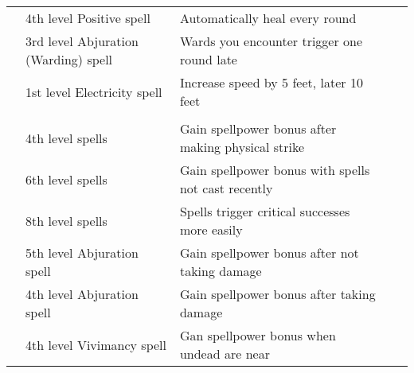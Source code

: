 \begin{longtabuwrapper}
\begin{longtabu}{>{\lcol}p{10em} >{\lcol}p{15em} >{\lcol}X >{\lcol}p{8em} >{\lcol}p{3em}}
         & 4th level Positive spell & Automatically heal every round & \x &  \\
         & 3rd level Abjuration (Warding) spell & Wards you encounter trigger one round late & \x &  \\
         & 1st level Electricity spell & Increase speed by 5 feet, later 10 feet & \x &  \\

        \midrule
         &  &  &   \\
         & 4th level spells & Gain spellpower bonus after making physical strike & \x &  \\
         & 6th level spells & Gain spellpower bonus with spells not cast recently & \x &  \\
         & 8th level spells & Spells trigger critical successes more easily & \x &  \\
         & 5th level Abjuration spell & Gain spellpower bonus after not taking damage & \x &  \\
         & 4th level Abjuration spell & Gain spellpower bonus after taking damage & \x &  \\
         & 4th level Vivimancy spell & Gan spellpower bonus when undead are near & \x &  \\


\end{longtabu}
\end{longtabuwrapper}
